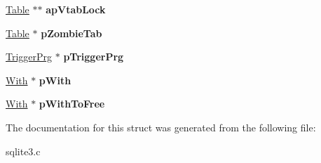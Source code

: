 \begin{DoxyCompactItemize}
\item 
\hyperlink{structTable}{Table} $\ast$$\ast$ {\bfseries ap\+Vtab\+Lock}\hypertarget{structParse_acdfd318c0f04ec640d6affc85ef8a009}{}\label{structParse_acdfd318c0f04ec640d6affc85ef8a009}

\item 
\hyperlink{structTable}{Table} $\ast$ {\bfseries p\+Zombie\+Tab}\hypertarget{structParse_a4e8319f0a7f0d21e472c13ac6cf67060}{}\label{structParse_a4e8319f0a7f0d21e472c13ac6cf67060}

\item 
\hyperlink{structTriggerPrg}{Trigger\+Prg} $\ast$ {\bfseries p\+Trigger\+Prg}\hypertarget{structParse_a0891dbd3b583594c5d07d7b061026ea4}{}\label{structParse_a0891dbd3b583594c5d07d7b061026ea4}

\item 
\hyperlink{structWith}{With} $\ast$ {\bfseries p\+With}\hypertarget{structParse_a7a812b036ddcc4b838b956328e1ff03e}{}\label{structParse_a7a812b036ddcc4b838b956328e1ff03e}

\item 
\hyperlink{structWith}{With} $\ast$ {\bfseries p\+With\+To\+Free}\hypertarget{structParse_ae8e4463fa9d87da2833a542e27dd722d}{}\label{structParse_ae8e4463fa9d87da2833a542e27dd722d}

\end{DoxyCompactItemize}


The documentation for this struct was generated from the following file\+:\begin{DoxyCompactItemize}
\item 
sqlite3.\+c\end{DoxyCompactItemize}
